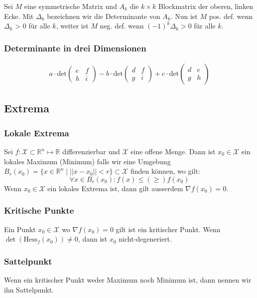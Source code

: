 \documentclass[a4paper,10pt]{article}
\def\R{\mathbb{R}}
\def\X{\mathcal{X}}
\begin{document}
Sei $M$ eine symmetrische Matrix und $A_k$ die $k \times k$ Blockmatrix der oberen, linken Ecke. Mit $\Delta_k$ bezeichnen wir die Determinante von $A_k$. Nun ist $M$ pos. def. wenn $\Delta_k$ > 0 für alle $k$, weiter ist $M$ neg. def.
wenn $(-1)^k \Delta_k > 0$ für alle $k$.

\subsubsection*{Determinante in drei Dimensionen}
\begin{align*}
  a \cdot \text{det}
  \begin{pmatrix}
    e & f\\
    h & i
  \end{pmatrix}
  - b \cdot \text{det}
  \begin{pmatrix}
    d & f\\
    g & i
  \end{pmatrix}
  + c \cdot \text{det}
  \begin{pmatrix}
    d & e\\
    g & h
  \end{pmatrix}
\end{align*}
\subsection{Extrema}
\subsubsection*{Lokale Extrema}
Sei \(f: \X \subset \R^n \mapsto \R\) differenzierbar und \(\X\) eine offene Menge. Dann ist \(x_0 \in \X\) ein lokales Maximum (Minimum) falls wir eine Umgebung \(B_r(x_0) = \{x\in \R^n \mid ||x-x_0|| < r \} \subset \X\) finden können, wo gilt:
\[\forall x \in B_r(x_0): f(x) \le (\ge) f(x_0)\]
Wenn \(x_0 \in \X\) ein lokales Extrema ist, dann gilt ausserdem \(\nabla f(x_0) = 0\).

\subsubsection*{Kritische Punkte}
Ein Punkt \(x_0 \in \X\) wo \(\nabla f(x_0) = 0\) gilt ist ein kritischer Punkt. Wenn \(\det(\text{Hess}_f(x_0)) \ne 0\), dann ist \(x_0\) nicht-degeneriert.

\subsubsection*{Sattelpunkt}
Wenn ein kritischer Punkt weder Maximum noch Minimum ist, dann nennen wir ihn Sattelpunkt.
\end{document}
